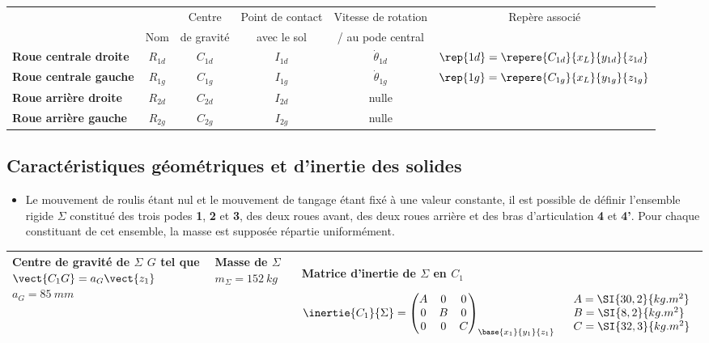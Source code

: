 \begin{tabular}{lccccc}
\hline
&                & Centre          & Point de contact& Vitesse de rotation &  Repère associé \\
&    Nom     & de gravité    & avec le sol &  / au pode central & \\
\hline
\textbf{Roue centrale droite} & $R_{1d}$ & $C_{1d}$ & $I_{1d}$ & $\dot{\theta}_{1d}$ & $\rep{1d}=\repere{C_{1d}}{x_L}{y_{1d}}{z_{1d}}$ \\ 
\textbf{Roue centrale gauche} & $R_{1g}$ & $C_{1g}$ & $I_{1g}$ & $\dot{\theta}_{1g}$ & $\rep{1g}=\repere{C_{1g}}{x_L}{y_{1g}}{z_{1g}}$ \\ 
\textbf{Roue arrière droite} & $R_{2d}$ & $C_{2d}$ & $I_{2d}$ & nulle &  \\ 
\textbf{Roue arrière gauche} & $R_{2g}$ & $C_{2g}$ & $I_{2g}$ & nulle &\\ \hline
\end{tabular}

\fi

\subsection*{Caractéristiques géométriques et d’inertie des solides}
\ifprof
\else

\begin{itemize}
\item Le mouvement de roulis étant nul et le mouvement de tangage étant fixé à une valeur constante, il est possible de définir l’ensemble rigide $\Sigma$ constitué des trois podes \textbf{1}, \textbf{2} et \textbf{3}, des deux roues avant, des deux roues arrière et des bras d’articulation \textbf{4} et \textbf{4’}. Pour chaque constituant de cet ensemble, la masse est supposée répartie uniformément.
\end{itemize}

\begin{center}
\begin{tabular}{|p{4cm}|p{4cm}|p{8cm}|}
\hline
Centre de gravité de $\Sigma$ 
$G$ tel que $\vect{C_1G}=a_G\vect{z_1}$
$a_G =\SI{85}{mm}$
& 
Masse de $\Sigma$ $m_{\Sigma}=\SI{152}{kg}$
& 
Matrice d'inertie de $\Sigma$ en $C_1$ 

$\inertie{C_1}{\Sigma}=
\begin{pmatrix} 
A & 0 & 0 \\ 0 & B & 0 \\ 0 & 0 & C 
\end{pmatrix}_{\base{x_1}{y_1}{z_1}}
\quad 
\begin{array}{l}
A =\SI{30,2}{kg.m^2} \\
B =\SI{8,2}{kg.m^2} \\
C =\SI{32,3}{kg.m^2} \\
\end{array}$ \\
\hline
\end{tabular}
\end{center}


